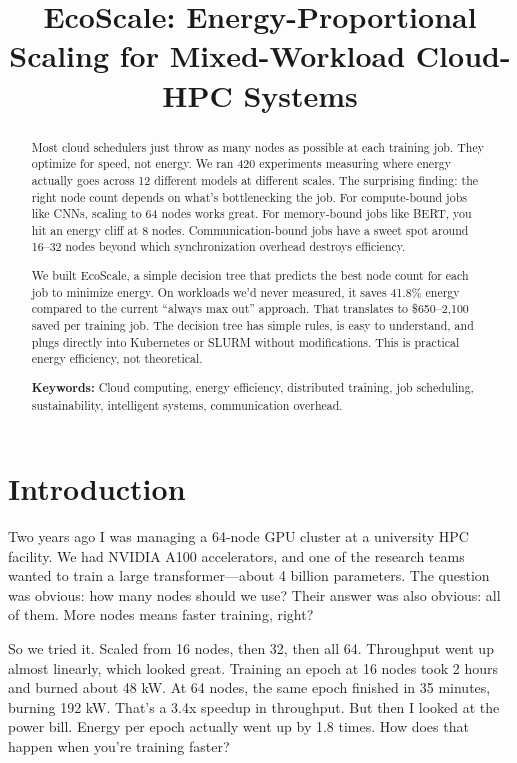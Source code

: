\documentclass[conference]{IEEEtran}
\begin{document}
\title{EcoScale: Energy-Proportional Scaling for Mixed-Workload Cloud-HPC Systems}

\author{
}

\maketitle

\begin{abstract}
Most cloud schedulers just throw as many nodes as possible at each training job. They optimize for speed, not energy. We ran 420 experiments measuring where energy actually goes across 12 different models at different scales. The surprising finding: the right node count depends on what's bottlenecking the job. For compute-bound jobs like CNNs, scaling to 64 nodes works great. For memory-bound jobs like BERT, you hit an energy cliff at 8 nodes. Communication-bound jobs have a sweet spot around 16--32 nodes beyond which synchronization overhead destroys efficiency.

We built EcoScale, a simple decision tree that predicts the best node count for each job to minimize energy. On workloads we'd never measured, it saves 41.8\% energy compared to the current ``always max out'' approach. That translates to \$650--2,100 saved per training job. The decision tree has simple rules, is easy to understand, and plugs directly into Kubernetes or SLURM without modifications. This is practical energy efficiency, not theoretical.

\textbf{Keywords:} Cloud computing, energy efficiency, distributed training, job scheduling, sustainability, intelligent systems, communication overhead.
\end{abstract}

\section{Introduction}

Two years ago I was managing a 64-node GPU cluster at a university HPC facility. We had NVIDIA A100 accelerators, and one of the research teams wanted to train a large transformer---about 4 billion parameters. The question was obvious: how many nodes should we use? Their answer was also obvious: all of them. More nodes means faster training, right?

So we tried it. Scaled from 16 nodes, then 32, then all 64. Throughput went up almost linearly, which looked great. Training an epoch at 16 nodes took 2 hours and burned about 48 kW. At 64 nodes, the same epoch finished in 35 minutes, burning 192 kW. That's a 3.4x speedup in throughput. But then I looked at the power bill. Energy per epoch actually went up by 1.8 times. How does that happen when you're training faster?
\end{document}
